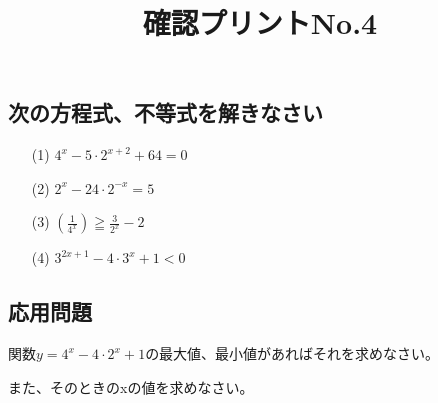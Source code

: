 \documentclass[12pt]{jarticle}
\title{確認プリントNo.4}
\begin{document}
\date{}
\maketitle
\vspace{-2cm}
\subsection*{次の方程式、不等式を解きなさい}
\begin{itemize}
  \item [(1)] $ \displaystyle 4^x -5\cdot2^{x+2} + 64=0$
  \item [(2)] $\displaystyle 2^x - 24\cdot 2^{-x} = 5$
  \item [(3)] $\displaystyle (\frac{1}{4^x})\geqq \frac{3}{2^x} - 2$
  \item [(4)] $\displaystyle 3^{2x+1} - 4\cdot 3^x + 1 <0$
\end{itemize}

\subsection*{応用問題}
関数$\displaystyle y = 4^x - 4\cdot2^x + 1$の最大値、最小値があればそれを求めなさい。

また、そのときのxの値を求めなさい。
\end{document}
